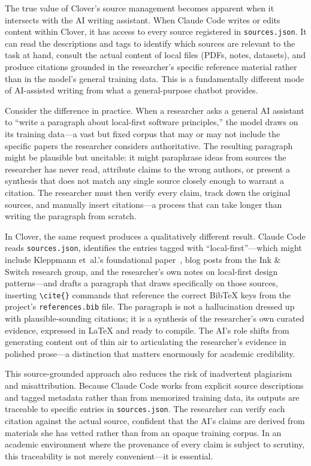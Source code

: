 \documentclass[a4paper,11pt]{article}
\begin{document}
The true value of Clover's source management becomes apparent when it intersects with the AI writing assistant. When Claude Code writes or edits content within Clover, it has access to every source registered in \texttt{sources.json}. It can read the descriptions and tags to identify which sources are relevant to the task at hand, consult the actual content of local files (PDFs, notes, datasets), and produce citations grounded in the researcher's specific reference material rather than in the model's general training data. This is a fundamentally different mode of AI-assisted writing from what a general-purpose chatbot provides.

Consider the difference in practice. When a researcher asks a general AI assistant to ``write a paragraph about local-first software principles,'' the model draws on its training data---a vast but fixed corpus that may or may not include the specific papers the researcher considers authoritative. The resulting paragraph might be plausible but uncitable: it might paraphrase ideas from sources the researcher has never read, attribute claims to the wrong authors, or present a synthesis that does not match any single source closely enough to warrant a citation. The researcher must then verify every claim, track down the original sources, and manually insert citations---a process that can take longer than writing the paragraph from scratch.

In Clover, the same request produces a qualitatively different result. Claude Code reads \texttt{sources.json}, identifies the entries tagged with ``local-first''---which might include Kleppmann et~al.'s foundational paper~\cite{Kleppmann2019LocalFirst}, blog posts from the Ink \& Switch research group, and the researcher's own notes on local-first design patterns---and drafts a paragraph that draws specifically on those sources, inserting \texttt{\textbackslash cite\{\}} commands that reference the correct BibTeX keys from the project's \texttt{references.bib} file. The paragraph is not a hallucination dressed up with plausible-sounding citations; it is a synthesis of the researcher's own curated evidence, expressed in \LaTeX{} and ready to compile. The AI's role shifts from generating content out of thin air to articulating the researcher's evidence in polished prose---a distinction that matters enormously for academic credibility.

This source-grounded approach also reduces the risk of inadvertent plagiarism and misattribution. Because Claude Code works from explicit source descriptions and tagged metadata rather than from memorized training data, its outputs are traceable to specific entries in \texttt{sources.json}. The researcher can verify each citation against the actual source, confident that the AI's claims are derived from materials she has vetted rather than from an opaque training corpus. In an academic environment where the provenance of every claim is subject to scrutiny, this traceability is not merely convenient---it is essential.
\end{document}
